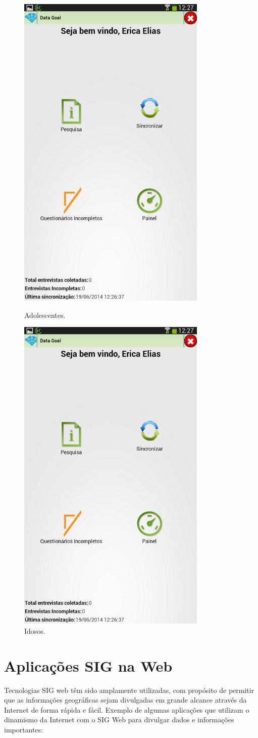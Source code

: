 \documentclass[
	12pt,				%
    oneside,			%
	a4paper,			%
	english,			%
	french,				%
	spanish,			%
	brazil,				%
	]{abntex2}
\begin{document}
\begin{figure}[H]

  \includegraphics[width=0.105\linewidth]{datagoal.png}
  \caption{\scriptsize Adolescentes.}\label{fig:awesome_image1}
\endminipage\hfill
{}%
  \includegraphics[width=0.45\linewidth]{datagoal.png}
  \caption{\scriptsize Idosos.}\label{fig:awesome_image3}
\endminipage

\end{figure}

\section{Aplicações SIG na Web}

Tecnologias SIG web têm sido amplamente utilizadas, com propósito de permitir que as informações geográficas sejam divulgadas em grande alcance através da Internet de forma rápida e fácil. Exemplo de algumas aplicações que utilizam o dinamismo da Internet com o SIG Web para divulgar dados e informações importantes:
\end{document}
